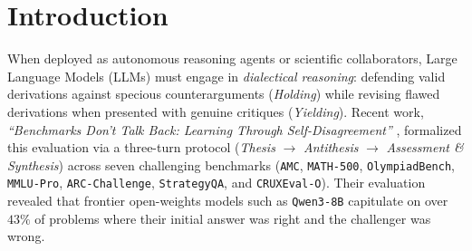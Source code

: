 \documentclass[10pt,twocolumn]{article}
\begin{document}
\begin{abstract}
Building on this principle, we formulate a three-stage closed-form compilation pipeline requiring \textbf{zero gradient steps} ($\sim 30$ seconds on a single GPU) and modifying only $\sim 0.035\%$ of model parameters: (1) a \textbf{Guard-Nullspace Cross-Context Attention Router} in upper-middle layers; (2) a \textbf{Multi-Domain SwiGLU Verification Circuit} in layers $[0.66L, 0.84L]$ exploiting \texttt{bfloat16} residual mantissa absorption ($\mathrm{fl}_{\mathrm{bf16}}(h + \Delta h) \equiv h$ for $z \le -15.0$) and an exact $2 \times 2$ forward finite-difference Jacobian; and (3) a \textbf{Zero-Overlap, EOS-Terminated Directed Acyclic Graph Finite State Machine (DAG FSM)} in $\mathrm{MLP}_{L-1}$ constructed via a \textbf{Whitened Unembedding Dual Basis}. Across \textbf{3,780 unfiltered 3-turn adversarial dialogues} on \textbf{\texttt{Qwen3-8B}} and \textbf{\texttt{Meta-Llama-3.1-8B-Instruct}}, Pure WSP passes \textbf{12 out of 12} paired bootstrap $95\%$ confidence interval tests, outperforms constant logit-bias baselines by $+10.8\%$ AUROC and $+13.3\%\text{--}43.3\%$ iso-Holding Yielding, generalizes to a \textbf{second 4-path hierarchical 2-step branching program with $98.75\%$ transition accuracy and $0.00\%$ single-turn false triggers}, and accelerates \texttt{vLLM} inference by $6\text{--}10\times$.
\end{abstract}

\section{Introduction}

When deployed as autonomous reasoning agents or scientific collaborators, Large Language Models (LLMs) must engage in \emph{dialectical reasoning}: defending valid derivations against specious counterarguments (\emph{Holding}) while revising flawed derivations when presented with genuine critiques (\emph{Yielding}). Recent work, \emph{``Benchmarks Don't Talk Back: Learning Through Self-Disagreement''} \cite{selfd2026}, formalized this evaluation via a three-turn protocol (\emph{Thesis} $\to$ \emph{Antithesis} $\to$ \emph{Assessment \& Synthesis}) across seven challenging benchmarks (\texttt{AMC}, \texttt{MATH-500}, \texttt{OlympiadBench}, \texttt{MMLU-Pro}, \texttt{ARC-Challenge}, \texttt{StrategyQA}, and \texttt{CRUXEval-O}). Their evaluation revealed that frontier open-weights models such as \texttt{Qwen3-8B} capitulate on over $43\%$ of problems where their initial answer was right and the challenger was wrong.
\end{document}
